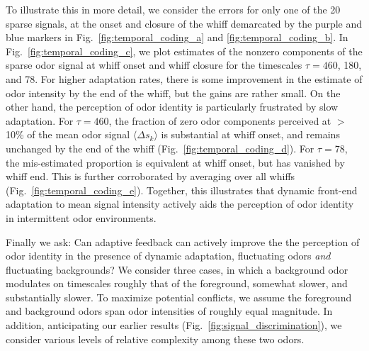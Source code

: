 
To illustrate this in more detail, we consider the errors for only one of the 20 sparse signals, at the onset and closure of the whiff demarcated by the purple and blue markers in Fig.~\ref{fig:temporal_coding_a} and \ref{fig:temporal_coding_b}. In Fig.~\ref{fig:temporal_coding_c}, we plot estimates of the nonzero components of the sparse odor signal at whiff onset and whiff closure for the timescales $\tau = 460$, 180, and 78. For higher adaptation rates, there is some improvement in the estimate of odor intensity by the end of the whiff, but the gains are rather small. On the other hand, the perception of odor identity is particularly frustrated by slow adaptation. For $\tau = 460$, the fraction of zero odor components perceived at $>$10\% of the mean odor signal $\langle \Delta s_k \rangle$ is substantial at whiff onset, and remains unchanged by the end of the whiff (Fig.~\ref{fig:temporal_coding_d}). For $\tau = 78$, the mis-estimated proportion is equivalent at whiff onset, but has vanished by whiff end. This is further corroborated by averaging over all whiffs (Fig.~\ref{fig:temporal_coding_e}). Together, this illustrates that dynamic front-end adaptation to mean signal intensity actively aids the perception of odor identity in intermittent odor environments. 


Finally we ask: Can adaptive feedback can actively improve the the perception of odor identity in the presence of dynamic adaptation, fluctuating odors \textit{and} fluctuating backgrounds? We consider three cases, in which a background odor modulates on timescales roughly that of the foreground, somewhat slower, and substantially slower. To maximize potential conflicts, we assume the foreground and background odors span odor intensities of roughly equal magnitude. In addition, anticipating our earlier results (Fig.~\ref{fig:signal_discrimination}), we consider various levels of relative complexity among these two odors. %

